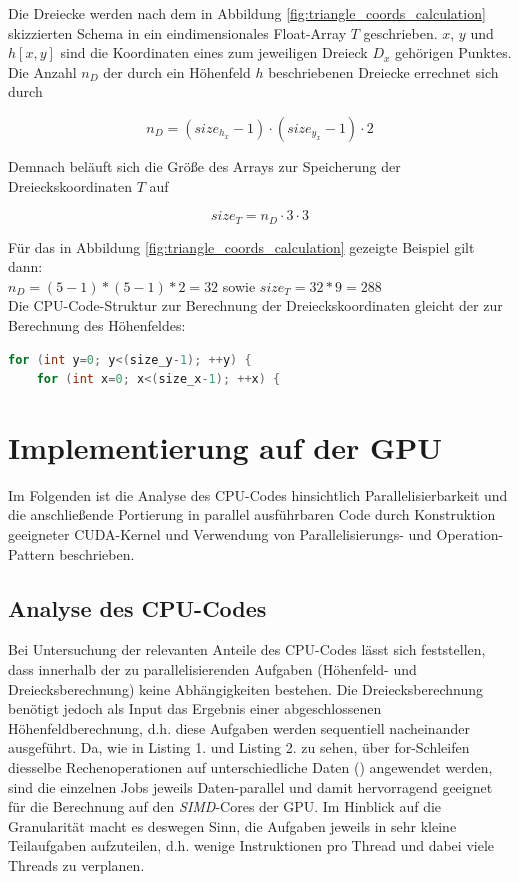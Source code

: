 \documentclass[conference]{IEEEtran}
\begin{document}
Die Dreiecke werden nach dem in Abbildung \ref{fig:triangle_coords_calculation} skizzierten Schema in ein eindimensionales Float-Array $T$ geschrieben. $x$, $y$ und $h[x,y]$ sind die Koordinaten eines zum jeweiligen Dreieck $D_x$ geh\"origen Punktes. Die Anzahl $n_D$ der durch ein H\"ohenfeld $h$ beschriebenen Dreiecke errechnet sich durch

\begin{equation}
n_D = (size_{h_x} - 1) \cdot (size_{y_x} - 1) \cdot 2
\end{equation}

Demnach bel\"auft sich die Gr\"o{\ss}e des Arrays zur Speicherung der Dreieckskoordinaten $T$ auf

\begin{equation}
size_T = n_D \cdot 3 \cdot 3
\end{equation}

F\"ur das in Abbildung \ref{fig:triangle_coords_calculation} gezeigte Beispiel gilt dann:\\ $n_D = (5-1) * (5-1) * 2 = 32$ sowie $size_T = 32 * 9 = 288$
\\
Die CPU-Code-Struktur zur Berechnung der Dreieckskoordinaten gleicht der zur Berechnung des H\"ohenfeldes:

\begin{lstlisting}[language=c, caption=Berechnung der Dreieckskoordinaten auf der CPU - Pseudo-Code, captionpos=b]
for (int y=0; y<(size_y-1); ++y) {
	for (int x=0; x<(size_x-1); ++x) {
\end{lstlisting}

\section{Implementierung auf der GPU}
Im Folgenden ist die Analyse des CPU-Codes hinsichtlich Parallelisierbarkeit und die anschlie{\ss}ende Portierung in parallel ausf\"uhrbaren Code durch Konstruktion geeigneter CUDA-Kernel und Verwendung von Parallelisierungs- und Operation-Pattern beschrieben. 

\subsection{Analyse des CPU-Codes}\label{sec:anal}
Bei Untersuchung der relevanten Anteile des CPU-Codes l\"asst sich feststellen, dass innerhalb der zu parallelisierenden Aufgaben (H\"ohenfeld- und Dreiecksberechnung) keine Abh\"angigkeiten bestehen.
Die Dreiecksberechnung ben\"otigt jedoch als Input das Ergebnis einer abgeschlossenen H\"ohenfeldberechnung, d.h. diese Aufgaben werden sequentiell nacheinander ausgef\"uhrt.
Da, wie in Listing 1. und Listing 2. zu sehen, \"uber for-Schleifen diesselbe Rechenoperationen auf unterschiedliche Daten () angewendet werden, sind die einzelnen Jobs jeweils Daten-parallel und damit hervorragend geeignet f\"ur die Berechnung auf den \textit{SIMD}-Cores der GPU.
Im Hinblick auf die Granularit\"at macht es deswegen Sinn, die Aufgaben jeweils in sehr kleine Teilaufgaben aufzuteilen, d.h. wenige Instruktionen pro Thread und dabei viele Threads zu verplanen.
\end{document}
